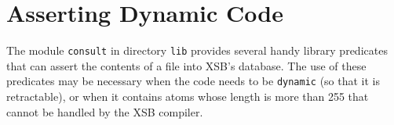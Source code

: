 
\section{Asserting Dynamic Code} \label{LoadDyn}

The module {\tt consult} in directory {\tt lib} provides several handy
library predicates that can assert the contents of a file into XSB's
database.  The use of these predicates may be necessary when the code
needs to be {\tt dynamic} (so that it is retractable), or when it
contains atoms whose length is more than 255 that cannot be handled by
the XSB compiler.

